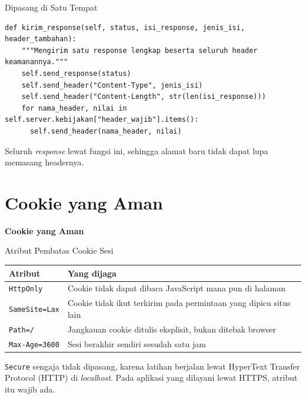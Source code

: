 \documentclass[aspectratio=169, table, 12pt]{beamer}
\begin{document}
\begin{frame}[fragile]{{\Large Dipasang di Satu Tempat}}
  \vspace{2pt}
\begin{lstlisting}[style=PythonStyle]
  def kirim_response(self, status, isi_response, jenis_isi, header_tambahan):
    """Mengirim satu response lengkap beserta seluruh header keamanannya."""
    self.send_response(status)
    self.send_header("Content-Type", jenis_isi)
    self.send_header("Content-Length", str(len(isi_response)))
    for nama_header, nilai in self.server.kebijakan["header_wajib"].items():
      self.send_header(nama_header, nilai)
\end{lstlisting}
  \vspace{4pt}
  {\small Seluruh \textit{response} lewat fungsi ini, sehingga alamat baru
  tidak dapat lupa memasang headernya.}
\end{frame}

\section{Cookie yang Aman}

\begin{frame}{\hfill}
  \centering
  \Huge{\textbf{Cookie yang Aman}}
\end{frame}

\begin{frame}{{\Large Atribut Pembatas Cookie Sesi}}
  \vspace{6pt}
  \centering
  {\footnotesize
  \begin{tabularx}{\textwidth}{lY}
    \hline
    \textbf{Atribut} & \textbf{Yang dijaga} \\
    \hline
    \texttt{HttpOnly} & Cookie tidak dapat dibaca JavaScript mana pun di halaman \\
    \hline
    \texttt{SameSite=Lax} & Cookie tidak ikut terkirim pada permintaan yang dipicu situs lain \\
    \hline
    \texttt{Path=/} & Jangkauan cookie ditulis eksplisit, bukan ditebak browser \\
    \hline
    \texttt{Max-Age=3600} & Sesi berakhir sendiri sesudah satu jam \\
    \hline
  \end{tabularx}}

  \vspace{8pt}
  {\small \texttt{Secure} sengaja tidak dipasang, karena latihan berjalan
  lewat HyperText Transfer Protocol (HTTP) di \textit{localhost}. Pada aplikasi yang dilayani lewat HTTPS,
  atribut itu wajib ada.}
\end{frame}
\end{document}

